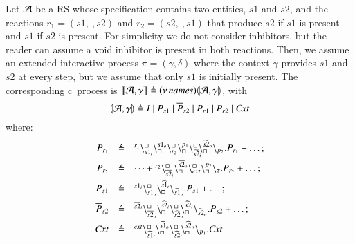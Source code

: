 \begin{example}\label{ex:backbone}
 Let ${\cal A}$ be a RS whose specification contains two entities, $s1$ and $s2$, and the reactions $r_1=(s1,\ , s2)$ and $r_2 = (s2, \ , s1)$ that produce $s2$ if $s1$ is present and $s1$ if $s2$ is present. For simplicity we do not consider inhibitors, but the reader can assume a void inhibitor is present in both reactions. Then, we assume an  extended interactive process $\pi=(\gamma,\delta)$ where the context $\gamma$ provides  $s1$ and $s2$ at every step, but we assume that only $s1$ is initially present. The corresponding c\CNA \ process is $\llbracket{\cal A},\gamma\rrbracket \triangleq (\nu\, \mathit{names}) \llparenthesis{\cal A},\gamma\rrparenthesis$, with 
$$
\llparenthesis{\cal A},\gamma\rrparenthesis \triangleq 
I ~|~ P_{s1}~|~\overline{P}_{s2}~|~ P_{r1}~|~P_{r2}~|~\mathit{Cxt}
$$
 where:
 \[
 \begin{array}{rcl}
 P_{r_1} &\triangleq& {}^{r_1}\backslash_{s1_i}^{\scriptstyle {\square}}\backslash_{\scriptstyle {\square}}^{s1_o}\backslash_{r_2}^{\scriptstyle {\square}}\backslash_{\scriptstyle {\square}}^{p_1}\backslash_{\widetilde{s2}_i}^{\scriptstyle {\square}}\!\!\backslash_{\scriptstyle {\square}}^{\widetilde{s2}_o}\backslash_{p_2}.P_{r_1} + \dots;   \\[6pt]
  P_{r_2} &\triangleq& \dots + {}^{r_2}\backslash_{\overline{s2}_i}^{\scriptstyle {\square}}\backslash_{\scriptstyle {\square}}^{\overline{s2}_o}\backslash_{\mathit{cxt}}^{\scriptstyle {\square}}\backslash_{\scriptstyle {\square}}^{p_2}\backslash_{\tau}.P_{r_2} + \dots; \\[6pt]
   P_{s1} &\triangleq& {}^{s1_i}\backslash_{s1_o}^{\scriptstyle {\square}}\backslash_{\scriptstyle {\square}}^{\widehat{s1}_i}\backslash_{\widehat{s1}_o}
 .P_{s1} + \dots; \\[6pt]
  \overline{P}_{s2} &\triangleq& {}^{\overline{s2}_i}\backslash_{\overline{s2}_o}^{\scriptstyle {\square}}
   \backslash_{\scriptstyle {\square}}^{\widehat{s2}_i}\backslash_{\widehat{s2}_o}^{\scriptstyle {\square}}\!\!\backslash_{\scriptstyle {\square}}^{\widetilde{s2}_i}\backslash_{\widetilde{s2}_o}.P_{s2} + \dots;\\[6pt]
 \mathit{Cxt}& \triangleq & {}^{\mathit{cxt}}\backslash_{\widehat{s1}_i}^{\scriptstyle {\square}}\backslash_{\scriptstyle {\square}}^{\widehat{s1}_o}
  \backslash_{\widehat{s2}_i}^{\scriptstyle {\square}}\!\backslash_{\scriptstyle {\square}}^{\widehat{s2}_o}\backslash_{p_1}.\mathit{Cxt}
\end{array}
\] 


\end{example}

